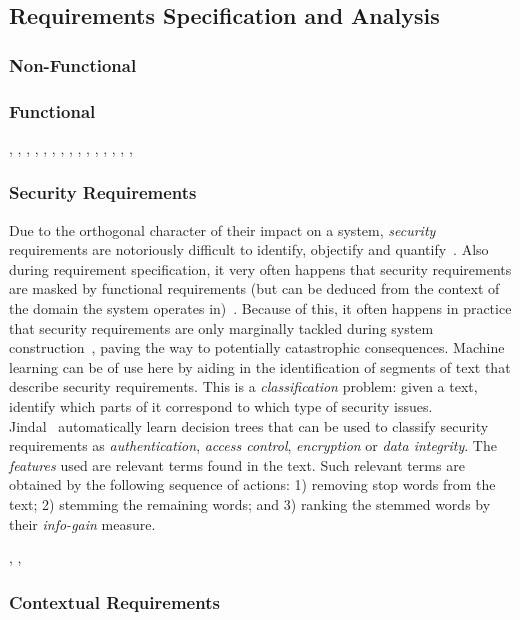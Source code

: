 \subsection{Requirements Specification and Analysis}

\subsubsection{Non-Functional}

\cite{Slankas:2013}

\subsubsection{Functional}

\cite{Deocadez:2017}, \cite{Kurtanovic:2017}, \cite{Guzman:2017},
\cite{Abad:2017}, \cite{Dekhtyar:2017}, \cite{Rashwan:2012}, \cite{Lu:2017},
\cite{Hayes:2014}, \cite{Williams:2017}, \cite{Garzoli:2013},
\cite{Casamayor:2010}, \cite{Wang:2016}, \cite{Hussain:2012}, \cite{Jiang:2014},
\cite{Jha:2017}, \cite{Pinquie:2015}

\subsubsection{Security Requirements} 

Due to the orthogonal character of their impact on a system, \emph{security}
requirements are notoriously difficult to identify, objectify and
quantify~\cite{}. Also during requirement specification, it very often
happens that security requirements are masked by functional requirements
(but can be deduced from the context of the domain the system operates
in)~\cite{Riaz:2014}. Because of this, it often happens in practice that
security requirements are only marginally tackled during system
construction~\cite{}, paving the way to potentially catastrophic consequences.
Machine learning can be of use here by aiding in the identification of segments
of text that describe security requirements. This is a \emph{classification}
problem: given a text, identify which parts of it correspond to which
type of security issues.\\

Jindal\etal~\cite{Jildal:2016} automatically learn decision trees that can be
used to classify security requirements as \emph{authentication}, \emph{access
control}, \emph{encryption} or \emph{data integrity}. The \emph{features} used
are relevant terms found in the text. Such relevant terms are obtained by the
following sequence of actions: 1) removing stop words from the text; 2) stemming
the remaining words; and 3) ranking the stemmed words by their \emph{info-gain}
measure.

\cite{Jildal:2016}, \cite{Riaz:2014}, \cite{Knauss:2011} 

\subsubsection{Contextual Requirements} 

